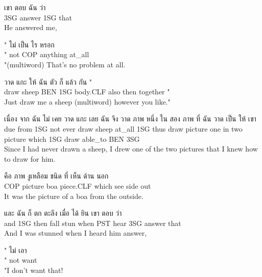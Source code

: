 \documentclass{book}
\begin{document}
	\begin{exe}
		\ex 
		\gll เขา ตอบ ฉัน ว่า\\
		\textsc{3SG} answer \textsc{1SG} that\\
		He answered me,
	\end{exe}

	\begin{exe}
		\ex 
		\gll " ไม่ เป็น ไร หรอก\\
		" not \textsc{COP} anything at\_all\\
		"(multiword) That's no problem at all.
	\end{exe}

	\begin{exe}
		\ex 
		\gll วาด แกะ ให้ ฉัน ตัว ก็ แล้ว กัน "\\
		draw sheep \textsc{BEN} \textsc{1SG} body.\textsc{CLF} also then together "\\
		Just draw me a sheep (multiword) however you like."
	\end{exe}

	\begin{exe}
		\ex 
		\gll เนื่อง จาก ฉัน ไม่ เคย วาด แกะ เลย ฉัน จึง วาด ภาพ หนึ่ง ใน สอง ภาพ ที่ ฉัน วาด เป็น ให้ เขา\\
		due from \textsc{1SG} not ever draw sheep at\_all \textsc{1SG} thus draw picture one in two picture which \textsc{1SG} draw able\_to \textsc{BEN} \textsc{3SG}\\
		Since I had never drawn a sheep, I drew one of the two pictures that I knew how to draw for him.
	\end{exe}

	\begin{exe}
		\ex 
		\gll คือ ภาพ งูเหลือม ชนิด ที่ เห็น ด้าน นอก\\
		\textsc{COP} picture boa piece.\textsc{CLF} which see side out\\
		It was the picture of a boa from the outside.
	\end{exe}

	\begin{exe}
		\ex 
		\gll และ ฉัน ก็ ตก ตะลึง เมื่อ ได้ ยิน เขา ตอบ ว่า\\
		and \textsc{1SG} then fall stun when \textsc{PST} hear \textsc{3SG} answer that\\
		And I was stunned when I heard him answer,
	\end{exe}

	\begin{exe}
		\ex 
		\gll " ไม่ เอา\\
		" not want\\
		"I don't want that!
	\end{exe}
\end{document}
